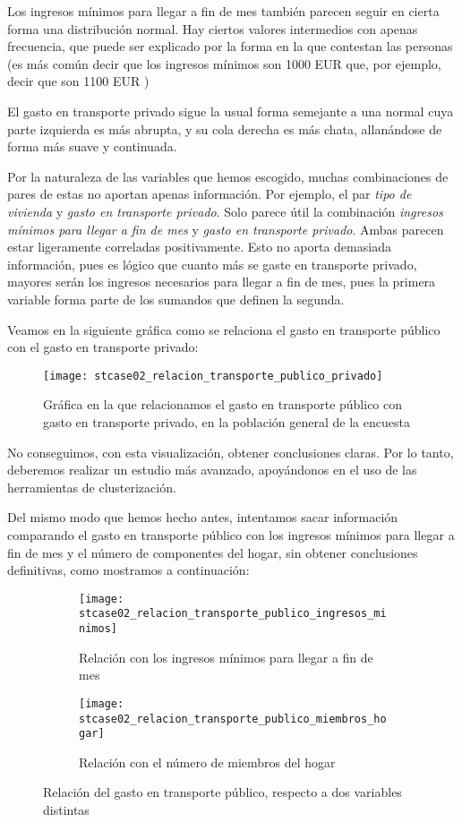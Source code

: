 \documentclass[11pt]{article}
\begin{document}
Los ingresos mínimos para llegar a fin de mes también parecen seguir en cierta forma una distribución normal. Hay ciertos valores intermedios con apenas frecuencia, que puede ser explicado por la forma en la que contestan las personas (es más común decir que los ingresos mínimos son 1000 EUR que, por ejemplo, decir que son 1100 EUR )

El gasto en transporte privado sigue la usual forma semejante a una normal cuya parte izquierda es más abrupta, y su cola derecha es más chata, allanándose de forma más suave y continuada.

Por la naturaleza de las variables que hemos escogido, muchas combinaciones de pares de estas no aportan apenas información. Por ejemplo, el par \emph{tipo de vivienda} y \emph{gasto en transporte privado}. Solo parece útil la combinación \emph{ingresos mínimos para llegar a fin de mes} y \emph{gasto en transporte privado}. Ambas parecen estar ligeramente correladas positivamente. Esto no aporta demasiada información, pues es lógico que cuanto más se gaste en transporte privado, mayores serán los ingresos necesarios para llegar a fin de mes, pues la primera variable forma parte de los sumandos que definen la segunda.

Veamos en la siguiente gráfica como se relaciona el gasto en transporte público con el gasto en transporte privado:

\begin{figure}[H]
    \centering

    \texttt{[image: stcase02\_relacion\_transporte\_publico\_privado]}
    \caption{Gráfica en la que relacionamos el gasto en transporte público con gasto en transporte privado, en la población general de la encuesta}
\end{figure}

No conseguimos, con esta visualización, obtener conclusiones claras. Por lo tanto, deberemos realizar un estudio más avanzado, apoyándonos en el uso de las herramientas de clusterización.

Del mismo modo que hemos hecho antes, intentamos sacar información comparando el gasto en transporte público con los ingresos mínimos para llegar a fin de mes y el número de componentes del hogar, sin obtener conclusiones definitivas, como mostramos a continuación:

\begin{figure}[H]
    \centering

    \begin{subfigure}[b]{0.45 \textwidth}
        \texttt{[image: stcase02\_relacion\_transporte\_publico\_ingresos\_minimos]}
        \caption{Relación con los ingresos mínimos para llegar a fin de mes}
    \end{subfigure}
    \begin{subfigure}[b]{0.45 \textwidth}
        \texttt{[image: stcase02\_relacion\_transporte\_publico\_miembros\_hogar]}
        \caption{Relación con el número de miembros del hogar}
    \end{subfigure}

    \caption{Relación del gasto en transporte público, respecto a dos variables distintas}
\end{figure}
\end{document}

